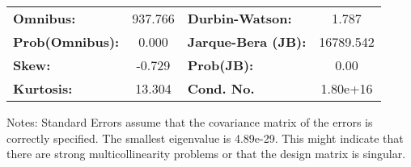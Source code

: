 \begin{center}
\begin{tabular}{lcccccc}
\end{tabular}
\begin{tabular}{lclc}
\textbf{Omnibus:}       & 937.766 & \textbf{  Durbin-Watson:     } &     1.787  \\
\textbf{Prob(Omnibus):} &   0.000 & \textbf{  Jarque-Bera (JB):  } & 16789.542  \\
\textbf{Skew:}          &  -0.729 & \textbf{  Prob(JB):          } &      0.00  \\
\textbf{Kurtosis:}      &  13.304 & \textbf{  Cond. No.          } &  1.80e+16  \\
\bottomrule
\end{tabular}
\end{center}

Notes: \newline
 [1] Standard Errors assume that the covariance matrix of the errors is correctly specified. \newline
 [2] The smallest eigenvalue is 4.89e-29. This might indicate that there are \newline
 strong multicollinearity problems or that the design matrix is singular.